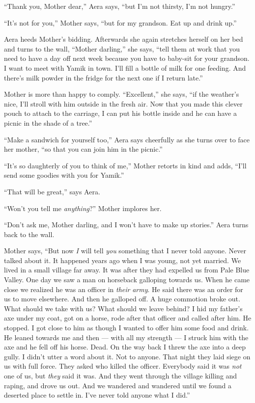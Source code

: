 \documentclass[twoside,11pt,openany]{book}
\begin{document}
``Thank you, Mother dear,'' Aera says, ``but I'm not thirsty, I'm not
hungry.''

``It's not for you,'' Mother says, ``but for my grandson. Eat up and drink
up.''

Aera heeds Mother's bidding. Afterwards she again stretches herself on her bed and turns to the wall,
``Mother darling,'' she says, ``tell them at work that you need to have a day
off next week because you have to baby-sit for your grandson. I want to meet with Yamik in town. I'll fill a bottle of
milk for one feeding. And there's milk powder in the fridge for the next one if I return late.''

Mother is more than happy to comply. ``Excellent,'' she says, ``if the weather's nice, I'll stroll with him
outside in the fresh air. Now that you made this clever pouch to attach to the carriage, I can put his bottle inside
and he can have a picnic in the shade of a tree.''

``Make a sandwich for yourself too,'' Aera says cheerfully as she turns over to face her
mother, ``so that you can join him in the picnic.''

``It's so daughterly of you to think of me,'' Mother retorts in kind and adds,
``I'll send some goodies with you for Yamik.''

``That will be great,'' says Aera.

``Won't you tell me \textit{anything}?'' Mother implores her.

``Don't ask me, Mother darling, and I won't have to make up stories.'' Aera
turns back to the wall.

Mother says, ``But now \textit{I }will tell \textit{you} something that I never told anyone. Never talked
about it. It happened years ago when I was young, not yet married. We lived in a small village far away. It was after
they had expelled us from Pale Blue Valley. One day we saw a man on horseback galloping towards us.  When he came close
we realized he was an officer in \textit{their} \textit{army}. He said there was an order for us to move elsewhere.
And then he galloped off. A huge commotion broke out. What should we take with us? What should we leave behind? I hid
my father's axe under my coat, got on a horse, rode after that officer and called after him. He stopped. I got close to
him as though I wanted to offer him some food and drink. He leaned towards me and then --- with all my strength ---  I
struck him with the axe and he fell off his horse. Dead. On the way back I threw the axe into a deep gully. I didn't
utter a word about it. Not to anyone. That night they laid siege on  us with full force. They asked who killed the
officer. Everybody said it was \textit{not} one of us, but \textit{they} said it was. And they went through the village
killing and raping, and drove us out. And we wandered and wandered until we found a deserted place to settle in. I've
never told anyone what I did.''
\end{document}
